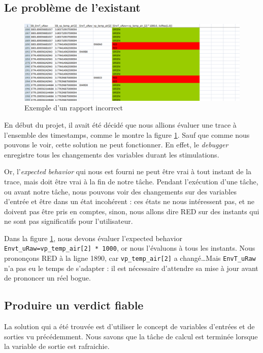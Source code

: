 \subsection{Le problème de l'existant}
\begin{figure}[H]
\centering
\includegraphics[width=1\linewidth]{contents/images/badReport}
\caption{Exemple d'un rapport incorrect}
\label{fig:badReport}
\end{figure}

En début du projet, il avait été décidé que nous allions évaluer une trace à l'ensemble des timestamps, comme le montre la figure \ref{fig:badReport}. Sauf que comme nous pouvons le voir, cette solution ne peut fonctionner. En effet, le \textit{debugger} enregistre tous les changements des variables durant les stimulations. 

Or, l'\textit{expected behavior} qui nous est fourni ne peut être vrai à tout instant de la trace, mais doit être vrai à la fin de notre tâche. Pendant l'exécution d'une tâche, ou avant notre tâche, nous pouvons voir des changements sur des variables d'entrée et être dans un état incohérent : ces états ne nous intéressent pas, et ne doivent pas être pris en comptes, sinon, nous allons dire RED sur des instants qui ne sont pas significatifs pour l'utilisateur.

Dans la figure \ref{fig:badReport}, nous devons évaluer l'expected behavior \texttt{Envt\_uRaw=vp\_temp\_air[2] * 1000}, or nous l'évaluons à tous les instants. Nous prononçons RED à la ligne 1890, car \texttt{vp\_temp\_air[2]} a changé\ldots Mais \texttt{EnvT\_uRaw} n'a pas eu le temps de s'adapter : il est nécessaire d'attendre sa mise à jour avant de prononcer un réel bogue.

\subsection{Produire un verdict fiable}
La solution qui a été trouvée est d'utiliser le concept de variables d'entrées et de sorties vu précédemment. Nous savons que la tâche de calcul est terminée lorsque la variable de sortie est rafraichie.  

